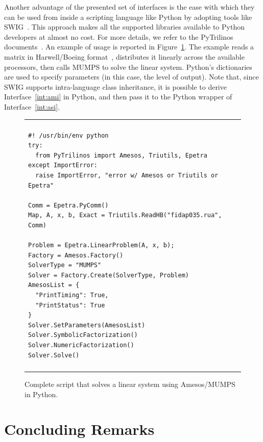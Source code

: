\documentclass[acmtocl]{acmtrans2m}
\newcommand{\amesos}{{\sc Amesos}}
\begin{document}
Another advantage of the presented set of interfaces is the ease with which
they can be used from inside a scripting language like Python by adopting
tools like SWIG~\cite{swig}. This approach makes all the supported libraries
available to Python developers at almost no cost. For more details, we refer
to the PyTrilinos documents~\cite{sala05pytrilinos,pytrilinos-la-guide}.  An
example of usage is reported in Figure~\ref{fig:pyamesos}. The example reads a
matrix in Harwell/Boeing format~\cite{duff89sparse}, distributes it linearly
across the available processors, then calls MUMPS to solve the linear system.
Python's dictionaries are used to specify parameters (in this case, the level
                                                      of output). Note that,
  since SWIG supports intra-language class inheritance, it is possible to
  derive Interface~\ref{int:ami} in Python, and then pass it to the Python
  wrapper of Interface~\ref{int:asi}. 

\begin{figure}
\begin{center}
\begin{tabular}{| p{12cm} |}
\hline
\\
\footnotesize
\begin{minipage}{11.5cm}
\begin{verbatim}
#! /usr/bin/env python
try:
  from PyTrilinos import Amesos, Triutils, Epetra
except ImportError:
  raise ImportError, "error w/ Amesos or Triutils or Epetra"

Comm = Epetra.PyComm()
Map, A, x, b, Exact = Triutils.ReadHB("fidap035.rua", Comm)

Problem = Epetra.LinearProblem(A, x, b);
Factory = Amesos.Factory()
SolverType = "MUMPS"
Solver = Factory.Create(SolverType, Problem)
AmesosList = {
  "PrintTiming": True,
  "PrintStatus": True
}
Solver.SetParameters(AmesosList)
Solver.SymbolicFactorization()
Solver.NumericFactorization()
Solver.Solve()
\end{verbatim}
\end{minipage}
\\
\\
\hline
\end{tabular}
\caption{Complete script that solves a linear system using \amesos/MUMPS in
  Python.}
\label{fig:pyamesos}
\end{center}
\end{figure}

\section{Concluding Remarks}
\label{sec:conclusions}
\end{document}
